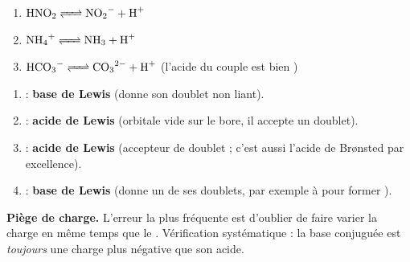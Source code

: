 \documentclass[11pt,a4paper]{article}
\begin{document}
\begin{corrbox}
\begin{enumerate}[label=\alph*),leftmargin=1.6em,itemsep=1pt]
  \item $\ce{HNO2 <=> NO2- + H+}$
  \item $\ce{NH4+ <=> NH3 + H+}$
  \item $\ce{HCO3- <=> CO3^{2-} + H+}$ \quad(l'acide du couple est bien )
\end{enumerate}
\end{corrbox}

\begin{corrbox}
\begin{enumerate}[label=\alph*),leftmargin=1.6em,itemsep=1pt]
  \item {} : \textbf{base de Lewis} (donne son doublet non liant).
  \item {} : \textbf{acide de Lewis} (orbitale vide sur le bore, il accepte un doublet).
  \item {} : \textbf{acide de Lewis} (accepteur de doublet ; c'est aussi l'acide de Brønsted par excellence).
  \item {} : \textbf{base de Lewis} (donne un de ses doublets, par exemple à  pour former ).
\end{enumerate}
\end{corrbox}

\begin{astuce}
\textbf{Piège de charge.} L'erreur la plus fréquente est d'oublier de faire varier la charge en même temps que
le . Vérification systématique : la base conjuguée est \emph{toujours} une charge plus négative que son
acide.
\end{astuce}
\end{document}
